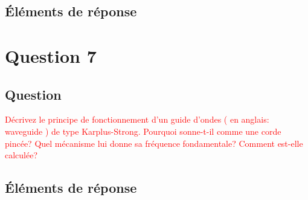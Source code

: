 \documentclass[letterpaper, 12pt]{article}
\newcommand{\alinea}{
\hspace*{0.5cm}}
\newcommand{\red}[1]{
	\textcolor{red}{#1}}
\begin{document}
		\subsection{\'Eléments de réponse}
			\alinea %
	\section{Question 7}
		\subsection{Question}
			\alinea \red{Décrivez le principe de fonctionnement d’un guide d’ondes ( en anglais: waveguide ) de type Karplus-Strong. 
				Pourquoi sonne-t-il comme une corde pincée? Quel mécanisme lui donne sa fréquence fondamentale? Comment est-elle calculée?}
		\subsection{\'Eléments de réponse}
			\alinea %
%
\end{document}
